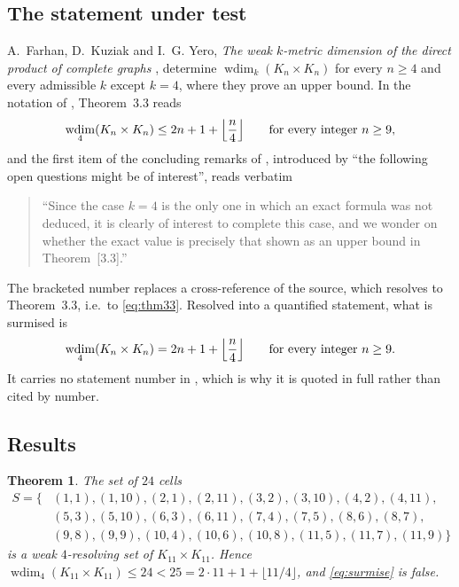 \documentclass[11pt]{amsart}
\newtheorem{theorem}{Theorem}[section]
\theoremstyle{remark}
\DeclareMathOperator{\wdim}{wdim}
\begin{document}
\subsection*{The statement under test}

A.~Farhan, D.~Kuziak and I.~G. Yero, \emph{The weak $k$-metric dimension of the
direct product of complete graphs} \cite{FKY}, determine
$\wdim_k(K_n\times K_n)$ for every $n\ge4$ and every admissible $k$ except
$k=4$, where they prove an upper bound. In the notation of \cite{FKY},
Theorem~3.3 reads
\begin{equation}\label{eq:thm33}
  \wdim_4(K_n\times K_n)\le 2n+1+\Bigl\lfloor\frac n4\Bigr\rfloor
  \qquad\text{for every integer } n\ge9 ,
\end{equation}
and the first item of the concluding remarks of \cite{FKY}, introduced by
``the following open questions might be of interest'', reads verbatim
\begin{quote}\small
``Since the case $k=4$ is the only one in which an exact formula was not
deduced, it is clearly of interest to complete this case, and we wonder on
whether the exact value is precisely that shown as an upper bound in
Theorem~[3.3].''
\end{quote}
The bracketed number replaces a cross-reference of the source, which resolves to
Theorem~3.3, i.e.\ to \eqref{eq:thm33}. Resolved into a quantified statement,
what is surmised is
\begin{equation}\label{eq:surmise}
  \wdim_4(K_n\times K_n)=2n+1+\Bigl\lfloor\frac n4\Bigr\rfloor
  \qquad\text{for every integer } n\ge9 .
\end{equation}
It carries no statement number in \cite{FKY}, which is why it is quoted in full
rather than cited by number.

\subsection*{Results}

\begin{theorem}\label{thm:main}
The set of $24$ cells
\begin{equation}\label{eq:S}
\begin{aligned}
 S=\{&(1,1),(1,10),(2,1),(2,11),(3,2),(3,10),(4,2),(4,11),\\
     &(5,3),(5,10),(6,3),(6,11),(7,4),(7,5),(8,6),(8,7),\\
     &(9,8),(9,9),(10,4),(10,6),(10,8),(11,5),(11,7),(11,9)\}
\end{aligned}
\end{equation}
is a weak $4$-resolving set of $K_{11}\times K_{11}$. Hence
$\wdim_4(K_{11}\times K_{11})\le 24<25=2\cdot11+1+\lfloor11/4\rfloor$, and
\eqref{eq:surmise} is false.
\end{theorem}
\end{document}
